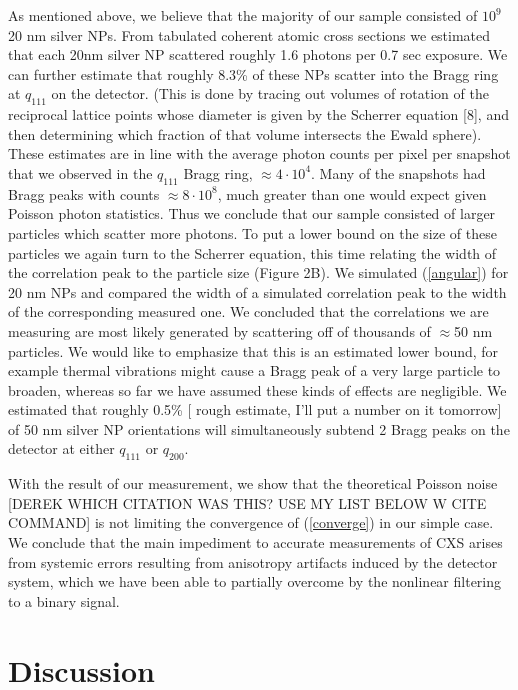 \documentclass [11pt,fleqn]{article}
\begin{document}
As mentioned above, we believe that the majority of our sample consisted of $10^9$ 20 nm silver NPs. From tabulated coherent atomic cross sections \cite{Henke:1993wx} we estimated that each 20nm silver NP scattered roughly 1.6 photons per 0.7 sec exposure. We can further estimate that roughly 8.3\% of these NPs scatter into the Bragg ring at $q_{111}$ on the detector. (This is done by tracing out volumes of rotation of the reciprocal lattice points whose diameter is given by the Scherrer equation [8], and then determining which fraction of that volume intersects the Ewald sphere). These estimates are in line with the average photon counts per pixel per snapshot that we observed in the $q_{111}$ Bragg ring, $\approx 4 \cdot10^4$. Many of the snapshots had Bragg peaks with counts $\approx 8 \cdot10^8$, much greater than one would expect given Poisson photon statistics. Thus we conclude that our sample consisted of larger particles which scatter more photons. To put a lower bound on the size of these particles we again turn to the Scherrer equation, this time relating the width of the correlation peak to the particle size (Figure 2B). We simulated (\ref{angular}) for 20 nm NPs and compared the width of a simulated correlation peak to the width of the corresponding measured one. We concluded that the correlations we are measuring are most likely generated by scattering off of thousands of $\approx$50 nm particles. We would like to emphasize that this is an estimated lower bound, for example thermal vibrations might cause a Bragg peak of a very large particle to broaden, whereas so far we have assumed these kinds of effects are negligible. We estimated that roughly 0.5\% [ rough estimate, I'll put a number on it tomorrow] of 50 nm silver NP orientations will simultaneously subtend 2 Bragg peaks on the detector at either $q_{111}$ or $q_{200}$.

With the result of our measurement, we show that the theoretical Poisson noise [DEREK WHICH CITATION WAS THIS? USE MY LIST BELOW W CITE COMMAND] is not limiting the convergence of (\ref{converge}) in our simple case. We conclude that the main impediment to accurate measurements of CXS arises from systemic errors resulting from anisotropy artifacts induced by the detector system, which we have been able to partially overcome by the nonlinear filtering to a binary signal.

\section{Discussion}
\end{document}
